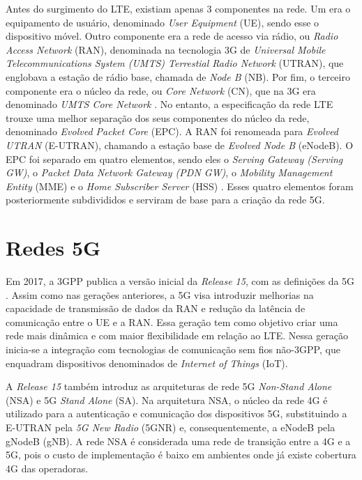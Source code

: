 Antes do surgimento do LTE, existiam apenas 3 componentes na rede. Um era o equipamento de usuário, denominado \textit{User Equipment} (UE), sendo esse o dispositivo móvel. Outro componente era a rede de acesso via rádio, ou \textit{Radio Access Network} (RAN), denominada na tecnologia 3G de \textit{Universal Mobile Telecommunications System (UMTS) Terrestial Radio Network} (UTRAN), que englobava a estação de rádio base, chamada de \textit{Node B} (NB). Por fim, o terceiro componente era o núcleo da rede, ou \textit{Core Network} (CN), que na 3G era denominado \textit{UMTS Core Network} \cite{Miah2002}.
No entanto, a especificação da rede LTE trouxe uma melhor separação dos seus componentes do núcleo da rede, denominado \textit{Evolved Packet Core} (EPC).
A RAN foi renomeada para \textit{Evolved UTRAN} (E-UTRAN), chamando a estação base de \textit{Evolved Node B} (eNodeB).
O EPC foi separado em quatro elementos, sendo eles o \textit{Serving Gateway (Serving GW)}, o \textit{Packet Data Network Gateway (PDN GW)}, o \textit{Mobility Management Entity} (MME) e o \textit{Home Subscriber Server} (HSS) \cite{3gpp.23.214}.
Esses quatro elementos foram posteriormente subdivididos e serviram de base para a criação da rede 5G.

\section{Redes 5G}

Em 2017, a 3GPP publica a versão inicial da \textit{Release 15}, com as definições da 5G \cite{3gpp.21.205}.
Assim como nas gerações anteriores, a 5G visa introduzir melhorias na capacidade de transmissão de dados da RAN e redução da latência de comunicação entre o UE e a RAN.
Essa geração tem como objetivo criar uma rede mais dinâmica e com maior flexibilidade em relação ao LTE.
Nessa geração inicia-se a integração com tecnologias de comunicação sem fios não-3GPP, que enquadram dispositivos denominados de \textit{Internet of Things} (IoT).

A \textit{Release 15} também introduz as arquiteturas de rede 5G \textit{Non-Stand Alone} (NSA) e 5G \textit{Stand Alone} (SA).
Na arquitetura NSA, o núcleo da rede 4G é utilizado para a autenticação e comunicação dos dispositivos 5G, substituindo a E-UTRAN pela \textit{5G New Radio} (5GNR) e, consequentemente, a eNodeB pela gNodeB (gNB).
A rede NSA é considerada uma rede de transição entre a 4G e a 5G, pois o custo de implementação é baixo em ambientes onde já existe cobertura 4G das operadoras.

